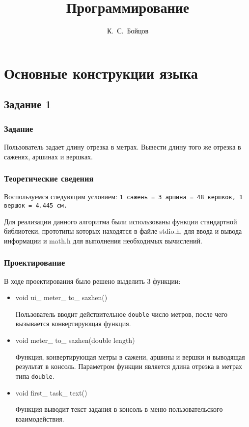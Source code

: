 \documentclass[12pt,a4paper]{report}
\author{К.~С.~Бойцов}
\title{Программирование}
\begin{document}
\maketitle
\chapter{Основные конструкции языка}
\section{Задание 1}
\subsection{Задание}

Пользователь задает длину отрезка в метрах. Вывести длину того же отрезка в саженях, аршинах и вершках.

\subsection{Теоретические сведения}

Воспользуемся следующим условием: \texttt{1 сажень = 3 аршина = 48 вершков, 1 вершок = 4.445 см.}

Для реализации данного алгоритма были использованы функции стандартной библиотеки, прототипы которых находятся в файле stdio.h, для ввода и вывода информации и math.h для выполнения необходимых вычислений.


\subsection{Проектирование}

В ходе проектирования было решено выделить 3 функции:

	\begin{itemize}
	

		\item void ui\_ meter\_ to\_ sazhen()
		
		 Пользователь вводит действительное \texttt{double} число метров, после чего вызывается конвертирующая функция.
		 
		 \item void meter\_ to\_ sazhen(double length)
		 
		 Функция, конвертирующая метры в сажени, аршины и вершки и выводящая результат в консоль.
		 Параметром функции является длина отрезка в метрах типа \texttt{double}. 
		 
		 \item void first\_ task\_ text()
	
	Функция выводит текст задания в консоль в меню пользовательского взаимодействия.
		 				
	\end{itemize}
\end{document}
